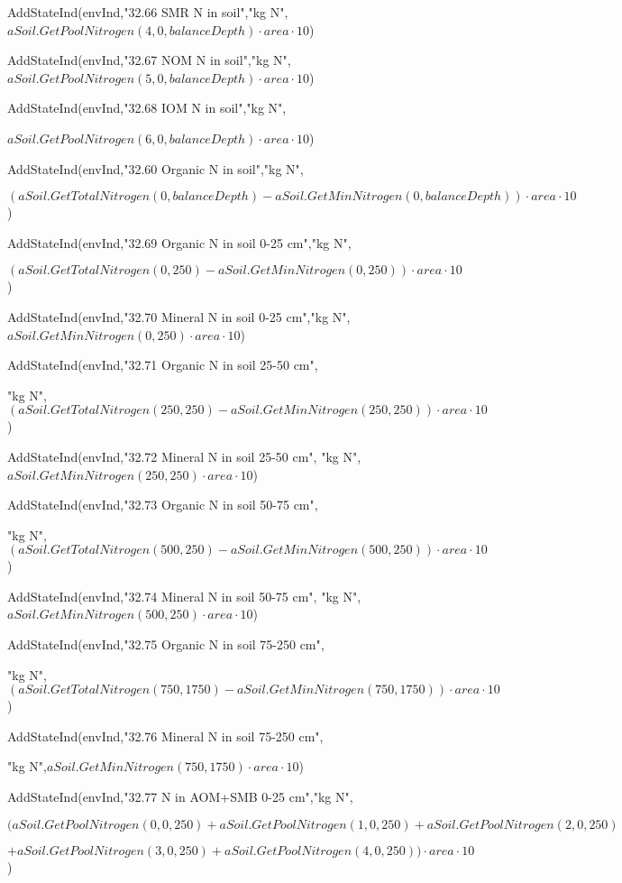 \documentclass[%
]{scrartcl}
\begin{document}
{{{  AddStateInd(envInd,"32.66 SMR N in soil","kg N",
$aSoil.GetPoolNitrogen(4,0,balanceDepth) \cdot area \cdot 10$)
   
  AddStateInd(envInd,"32.67 NOM N in soil","kg N",
$aSoil.GetPoolNitrogen(5,0,balanceDepth) \cdot area \cdot 10$)
  
  AddStateInd(envInd,"32.68 IOM N in soil","kg N",

$aSoil.GetPoolNitrogen(6,0,balanceDepth) \cdot area \cdot 10$)
  
  AddStateInd(envInd,"32.60 Organic N in soil","kg N",

$(aSoil.GetTotalNitrogen(0,balanceDepth)
-aSoil.GetMinNitrogen(0,balanceDepth)) \cdot area \cdot 10$)

	AddStateInd(envInd,"32.69 Organic N in soil 0-25 cm","kg N",

$(aSoil.GetTotalNitrogen(0,250)-aSoil.GetMinNitrogen(0,250)) \cdot area \cdot 10$)
	
AddStateInd(envInd,"32.70 Mineral N in soil 0-25 cm","kg N",
$aSoil.GetMinNitrogen(0,250) \cdot area \cdot 10$)
	
AddStateInd(envInd,"32.71 Organic N in soil 25-50 cm",

"kg N",$(aSoil.GetTotalNitrogen(250,250)-aSoil.GetMinNitrogen(250,250)) \cdot area \cdot 10$)
	
AddStateInd(envInd,"32.72 Mineral N in soil 25-50 cm",
"kg N",$aSoil.GetMinNitrogen(250,250) \cdot area \cdot 10$)
	
AddStateInd(envInd,"32.73 Organic N in soil 50-75 cm",

"kg N",$(aSoil.GetTotalNitrogen(500,250)-aSoil.GetMinNitrogen(500,250)) \cdot area \cdot 10$)
	
AddStateInd(envInd,"32.74 Mineral N in soil 50-75 cm",
"kg N",$aSoil.GetMinNitrogen(500,250) \cdot area \cdot 10$)
	 
AddStateInd(envInd,"32.75 Organic N in soil 75-250 cm",

"kg N",$(aSoil.GetTotalNitrogen(750,1750)-aSoil.GetMinNitrogen(750,1750)) \cdot area \cdot 10$)
	
AddStateInd(envInd,"32.76 Mineral N in soil 75-250 cm",

"kg N",$aSoil.GetMinNitrogen(750,1750) \cdot area \cdot 10$)
	
AddStateInd(envInd,"32.77 N in AOM+SMB 0-25 cm","kg N",
	   	
 $(aSoil.GetPoolNitrogen(0,0,250)+aSoil.GetPoolNitrogen(1,0,250)
+aSoil.GetPoolNitrogen(2,0,250)$

$+	     
 aSoil.GetPoolNitrogen(3,0,250)+aSoil.GetPoolNitrogen(4,0,250)) 
\cdot area \cdot 10$)
		
}}}
\end{document}
